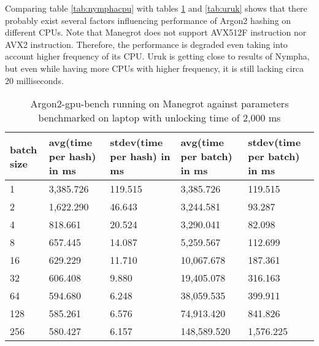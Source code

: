 \documentclass[nolof]{fithesis3}
\begin{document}
\FloatBarrier

Comparing table \ref{tab:nymphacpu} with tables \ref{tab:manegrot} and \ref{tab:uruk} shows that there probably exist several factors influencing performance of Argon2 hashing on different CPUs. Note that Manegrot does not support AVX512F instruction nor AVX2 instruction. Therefore, the performance is degraded even taking into account higher frequency of its CPU. Uruk is getting close to results of Nympha, but even while having more CPUs with higher frequency, it is still lacking circa 20 milliseconds.

\FloatBarrier

\noindent
\begin{table}
\caption{Argon2-gpu-bench running on Manegrot against parameters benchmarked on laptop with unlocking time of 2,000 ms}
\label{tab:manegrot}
\begin{tabularx}{\textwidth}{| X | X | X | X | X |}
\hline
batch size & avg(time per hash) in ms & stdev(time per hash) in ms & avg(time per batch) in ms & stdev(time per batch) in ms\\
\hline
1 & 3,385.726 & 119.515 & 3,385.726 & 119.515\\
\hline
2 & 1,622.290 & 46.643 & 3,244.581 & 93.287\\
\hline
4 & 818.661 & 20.524 & 3,290.041 & 82.098\\
\hline
8 & 657.445 & 14.087 & 5,259.567 & 112.699\\
\hline
16 & 629.229 & 11.710 & 10,067.678 & 187.361\\
\hline
32 & 606.408 & 9.880 & 19,405.078 & 316.163\\
\hline
64 & 594.680 & 6.248 & 38,059.535 & 399.911\\
\hline
128 & 585.261 & 6.576 & 74,913.420 & 841.826\\
\hline
256 & 580.427 & 6.157 & 148,589.520 & 1,576.225\\
\hline
\end{tabularx}
\end{table}
\end{document}
